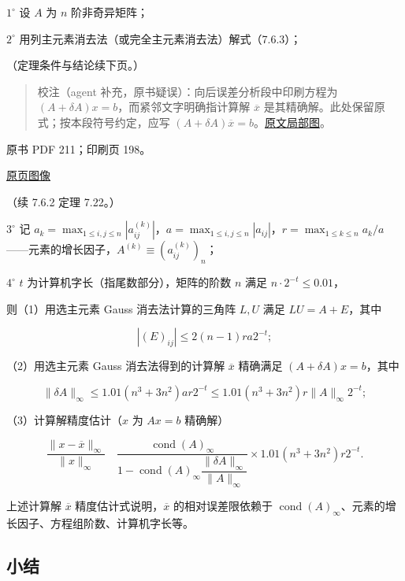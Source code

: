\documentclass[
  10pt,
  fontset=fandol]{ctexart}
\begin{document}
\(1^\circ\) 设 \(A\) 为 \(n\) 阶非奇异矩阵；

\(2^\circ\) 用列主元素消去法（或完全主元素消去法）解式（7.6.3）；

（定理条件与结论续下页。）

\begin{quote}
校注（agent 补充，原书疑误）：向后误差分析段中印刷方程为
\((A+\delta A)x=b\)，而紧邻文字明确指计算解 \(\overline x\)
是其精确解。此处保留原式；按本段符号约定，应写
\((A+\delta A)\overline x=b\)。\href{/Users/xiangjunfeng/Desktop/数值计算专用/numerical-analysis/book/staging/ch07b/assets/210-backward-error.png}{原文局部图}。
\end{quote}

\clearpage

原书 PDF 211；印刷页 198。

\href{/Users/xiangjunfeng/Desktop/数值计算专用/numerical-analysis/book/source-images/pdf-211.jpeg}{原页图像}

（续 7.6.2 定理 7.22。）

\(3^\circ\) 记
\(a_k=\max_{1\leqslant i,j\leqslant n}|a_{ij}^{(k)}|\)，\(a=\max_{1\leqslant i,j\leqslant n}|a_{ij}|\)，\(r=\max_{1\leqslant k\leqslant n}a_k/a\)------元素的增长因子，\(A^{(k)}\equiv(a_{ij}^{(k)})_n\)；

\(4^\circ\) \(t\) 为计算机字长（指尾数部分），矩阵的阶数 \(n\) 满足
\(n\cdot2^{-t}\leqslant0.01\)，

则（1）用选主元素 Gauss 消去法计算的三角阵 \(L,U\) 满足 \(LU=A+E\)，其中

\[
|(E)_{ij}|\leqslant2(n-1)ra2^{-t};
\]

（2）用选主元素 Gauss 消去法得到的计算解 \(\overline x\) 精确满足
\((A+\delta A)x=b\)，其中

\[
\|\delta A\|_\infty\leqslant1.01(n^3+3n^2)ar2^{-t}\leqslant1.01(n^3+3n^2)r\|A\|_\infty2^{-t};
\]

（3）计算解精度估计（\(x\) 为 \(Ax=b\) 精确解）

\[
\frac{\|x-\overline x\|_\infty}{\|x\|_\infty}
\quad
\frac{\operatorname{cond}(A)_\infty}
{1-\operatorname{cond}(A)_\infty\dfrac{\|\delta A\|_\infty}{\|A\|_\infty}}
\times1.01(n^3+3n^2)r2^{-t}.
\tag{7.6.14}
\]

上述计算解 \(\overline x\) 精度估计式说明，\(\overline x\)
的相对误差限依赖于
\(\operatorname{cond}(A)_\infty\)、元素的增长因子、方程组阶数、计算机字长等。

\subsection{小结}\label{ux5c0fux7ed3}
\end{document}

